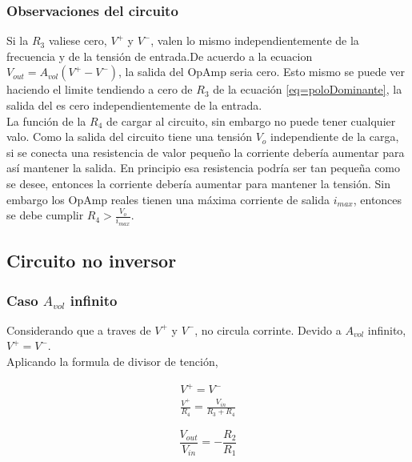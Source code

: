 \documentclass[../../main.tex]{subfiles}
\begin{document}




\subsubsection{Observaciones del circuito}
Si la $R_{3}$ valiese cero, $V^{+}$ y $V^{-}$, valen lo mismo independientemente de la frecuencia y de la tensión de entrada.De acuerdo a la ecuacion $V_{out}=A_{vol}(V^{+}-V^{-})$, la salida del OpAmp seria cero. Esto mismo se puede ver haciendo el limite tendiendo a cero de $R_{3}$ de la ecuación \ref{eq=poloDominante}, la salida del es cero independientemente de la entrada.
\\
La función de la $R_{4}$ de cargar al circuito, sin embargo no puede tener cualquier valo. Como la salida del circuito tiene una tensión $V_{o}$ independiente de la carga, si se conecta una resistencia de valor pequeño la corriente debería aumentar para así mantener la salida. En principio esa resistencia podría ser tan pequeña como se desee, entonces la corriente debería aumentar para mantener la tensión. Sin embargo los OpAmp reales tienen una máxima corriente de salida $i_{max}$, entonces se debe cumplir $R_{4}> \frac {V_{o}}{ i_{max}}$.




\subsection{Circuito no inversor}


\subsubsection{Caso $A_{vol}$ infinito}
Considerando que a traves de $V^{+}$ y $V^{-}$, no circula corrinte. Devido a  $A_{vol}$ infinito, $V^{+}=V^{-}$.
\\
Aplicando la formula de divisor de tención,

\begin{gather}
V^{+}=V^{-}\\
\frac {V^{+}} {R_{4}}=\frac{V_{in}}{R_{3}+R_{4}}

\end{gather}

\begin{equation}
\frac{V_{out}}{V_{in}}= -\frac{R_{2}}{R_{1}} \label{eq=CircuitoAideal}
\end{equation}
\end{document}
